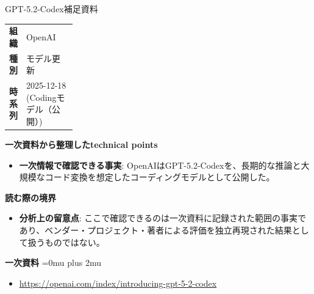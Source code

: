\begin{technicalnote}{GPT-5.2-Codex}{補足資料}
\begingroup
\begin{tabularx}{\linewidth}{@{}>{\bfseries}p{0.22\linewidth}X@{}}
組織 & OpenAI \\
種別 & モデル更新 \\
時系列 & 2025-12-18 (Codingモデル（公開）) \\
\end{tabularx}
\smallskip
{\bfseries 一次資料から整理したtechnical points}
\begin{itemize}[leftmargin=1.5em,itemsep=0.35em]
\item \textbf{一次情報で確認できる事実}: OpenAIはGPT-5.2-Codexを、長期的な推論と大規模なコード変換を想定したコーディングモデルとして公開した。
\end{itemize}
\begin{minipage}{\linewidth}
{\bfseries 読む際の境界}
\begin{itemize}[leftmargin=1.5em,itemsep=0.35em]
\item \textbf{分析上の留意点}: ここで確認できるのは一次資料に記録された範囲の事実であり、ベンダー・プロジェクト・著者による評価を独立再現された結果として扱うものではない。
\end{itemize}
\begin{samepage}
{\bfseries 一次資料}
\begingroup\sloppy
\Urlmuskip=0mu plus 2mu\relax
\begin{itemize}[leftmargin=1.5em,itemsep=0.25em]
\item {\scriptsize\url{https://openai.com/index/introducing-gpt-5-2-codex}}
\end{itemize}
\endgroup
\end{samepage}
\end{minipage}
\endgroup
\end{technicalnote}
\medskip
